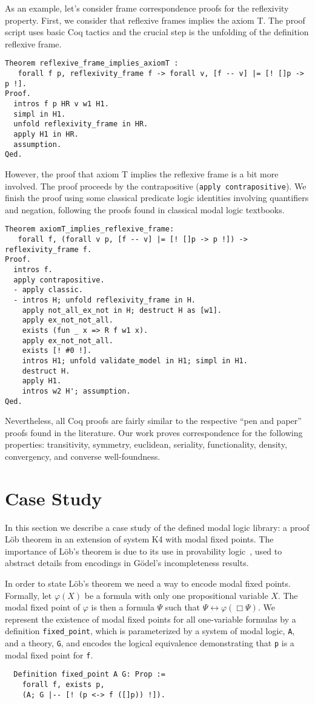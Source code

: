 \documentclass[3p,times]{elsarticle}
\begin{document}
As an example, let's consider frame correspondence proofs for the reflexivity property.
First, we consider that reflexive frames implies the axiom T. The proof script
uses basic Coq tactics and the crucial step is the unfolding of the definition
reflexive frame.
\begin{verbatim}
Theorem reflexive_frame_implies_axiomT :
   forall f p, reflexivity_frame f -> forall v, [f -- v] |= [! []p -> p !].
Proof.
  intros f p HR v w1 H1.
  simpl in H1.
  unfold reflexivity_frame in HR.
  apply H1 in HR.
  assumption.
Qed.
\end{verbatim}
However, the proof that axiom T implies the reflexive frame is a bit more involved. The proof
proceeds by the contrapositive (\texttt{apply contrapositive}). We finish the proof
using some classical predicate logic identities involving quantifiers and negation, following
the proofs found in classical modal logic textbooks.
\begin{verbatim}
Theorem axiomT_implies_reflexive_frame:
   forall f, (forall v p, [f -- v] |= [! []p -> p !]) -> reflexivity_frame f.
Proof.
  intros f.
  apply contrapositive.
  - apply classic.
  - intros H; unfold reflexivity_frame in H.
    apply not_all_ex_not in H; destruct H as [w1].
    apply ex_not_not_all.
    exists (fun _ x => R f w1 x).
    apply ex_not_not_all.
    exists [! #0 !].
    intros H1; unfold validate_model in H1; simpl in H1.
    destruct H.
    apply H1.
    intros w2 H'; assumption.
Qed.
\end{verbatim}
Nevertheless, all Coq proofs are fairly similar to the respective
``pen and paper'' proofs found in the literature.
Our work proves correspondence for the following properties:
transitivity, symmetry,  euclidean, seriality, functionality, density, convergency,
and converse well-foundness.

\section{Case Study}\label{sec:case}

In this section we describe a case study of the defined modal logic library:
a proof L\"ob theorem in an extension of system K4 with modal fixed points.
The importance of L\"ob's theorem is due to its use in provability
logic~\cite{boolos_1994}, used to abstract details from encodings in G\"odel's
incompleteness results.

In order to state L\"ob's theorem we need a way to encode modal
fixed points. Formally, let $\varphi(X)$ be a formula with only one propositional variable
$X$. The modal fixed point of $\varphi$ is then a formula $\Psi$ such that
$\Psi \leftrightarrow \varphi(\Box \Psi)$.
We represent the existence of modal fixed points for all one-variable formulas by a definition \texttt{fixed_point},
which is parameterized by a system of modal logic, \texttt{A}, and a
theory, \texttt{G}, and encodes the logical equivalence demonstrating
that \texttt{p} is a modal fixed point for \texttt{f}.
\begin{verbatim}
  Definition fixed_point A G: Prop :=
    forall f, exists p,
    (A; G |-- [! (p <-> f ([]p)) !]).
\end{verbatim}
\end{document}
